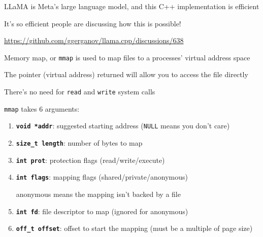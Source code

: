   \begin{slide}
    

    LLaMA is Meta's large language model, and this C++ implementation is
    efficient
    \medskip

    It's so efficient people are discussing how this is possible!

    \url{https://github.com/ggerganov/llama.cpp/discussions/638}

  \end{slide}

  \begin{slide}
    

    Memory map, or \texttt{mmap} is used to map files to a processes' virtual
    address space
    \medskip

    The pointer (virtual address) returned will allow you to access the file
    directly

    \leftspace{}There's no need for \texttt{read} and \texttt{write} system
    calls

  \end{slide}

  \begin{slide}
    

    \texttt{mmap} takes 6 arguments:

    \begin{enumerate}
      \item \texttt{\bfseries void *addr}: suggested starting address
            (\texttt{NULL} means you don't care)
      \item \texttt{\bfseries size\_t length}: number of bytes to map
      \item \texttt{\bfseries int prot}: protection flags (read/write/execute)
      \item \texttt{\bfseries int flags}: mapping flags
            (shared/private/anonymous)

            \hspace{5em}  anonymous means the mapping isn't backed by a file
      \item \texttt{\bfseries int fd}: file descriptor to map (ignored for
            anonymous)
      \item \texttt{\bfseries off\_t offset}: offset to start the mapping (must
            be a multiple of page size)
    \end{enumerate}

  \end{slide}

